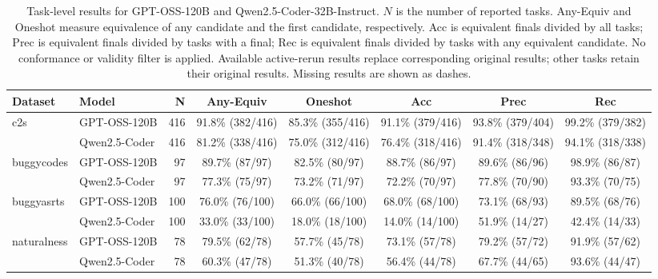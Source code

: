 \begin{table}[t]
\centering
\footnotesize
\setlength{\tabcolsep}{4pt}
\renewcommand{\arraystretch}{1.15}
\begin{tabular}{llrccccc}
\toprule
\textbf{Dataset} & \textbf{Model} & \textbf{N} & \textbf{Any-Equiv} & \textbf{Oneshot} & \textbf{Acc} & \textbf{Prec} & \textbf{Rec} \\
\midrule
c2s & GPT-OSS-120B & 416 & 91.8\% (382/416) & 85.3\% (355/416) & 91.1\% (379/416) & 93.8\% (379/404) & 99.2\% (379/382) \\
 & Qwen2.5-Coder & 416 & 81.2\% (338/416) & 75.0\% (312/416) & 76.4\% (318/416) & 91.4\% (318/348) & 94.1\% (318/338) \\
\midrule
buggycodes & GPT-OSS-120B & 97 & 89.7\% (87/97) & 82.5\% (80/97) & 88.7\% (86/97) & 89.6\% (86/96) & 98.9\% (86/87) \\
 & Qwen2.5-Coder & 97 & 77.3\% (75/97) & 73.2\% (71/97) & 72.2\% (70/97) & 77.8\% (70/90) & 93.3\% (70/75) \\
\midrule
buggyasrts & GPT-OSS-120B & 100 & 76.0\% (76/100) & 66.0\% (66/100) & 68.0\% (68/100) & 73.1\% (68/93) & 89.5\% (68/76) \\
 & Qwen2.5-Coder & 100 & 33.0\% (33/100) & 18.0\% (18/100) & 14.0\% (14/100) & 51.9\% (14/27) & 42.4\% (14/33) \\
\midrule
naturalness & GPT-OSS-120B & 78 & 79.5\% (62/78) & 57.7\% (45/78) & 73.1\% (57/78) & 79.2\% (57/72) & 91.9\% (57/62) \\
 & Qwen2.5-Coder & 78 & 60.3\% (47/78) & 51.3\% (40/78) & 56.4\% (44/78) & 67.7\% (44/65) & 93.6\% (44/47) \\
\bottomrule
\end{tabular}
\caption{Task-level results for GPT-OSS-120B and Qwen2.5-Coder-32B-Instruct. $N$ is the number of reported tasks. Any-Equiv and Oneshot measure equivalence of any candidate and the first candidate, respectively. Acc is equivalent finals divided by all tasks; Prec is equivalent finals divided by tasks with a final; Rec is equivalent finals divided by tasks with any equivalent candidate. No conformance or validity filter is applied. Available active-rerun results replace corresponding original results; other tasks retain their original results. Missing results are shown as dashes.}
\label{tab:main-metrics}
\end{table}
